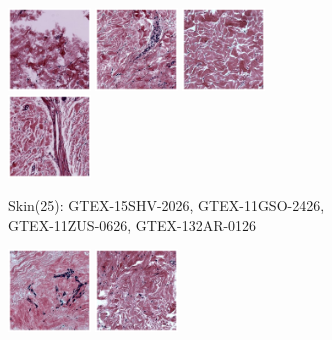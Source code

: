 \documentclass{l4proj}
\begin{document}
\begin{figure}[h]
    \centering
    \begin{subfigure}[b]{\textwidth}
        \includegraphics[width=0.24\textwidth]{images/skin25_1.png}
        \includegraphics[width=0.24\textwidth]{images/skin25_2.png}
        \includegraphics[width=0.24\textwidth]{images/skin25_3.png}
        \includegraphics[width=0.24\textwidth]{images/skin25_4.png}
        \caption{Skin(25): GTEX-15SHV-2026, GTEX-11GSO-2426, GTEX-11ZUS-0626, GTEX-132AR-0126}
        \label{fig:skin25}
    \end{subfigure}
    \begin{subfigure}[b]{\textwidth}
        \includegraphics[width=0.24\textwidth]{images/breast25_1.png}
        \includegraphics[width=0.24\textwidth]{images/breast25_2.png}

\end{subfigure}
\end{figure}
\end{document}
